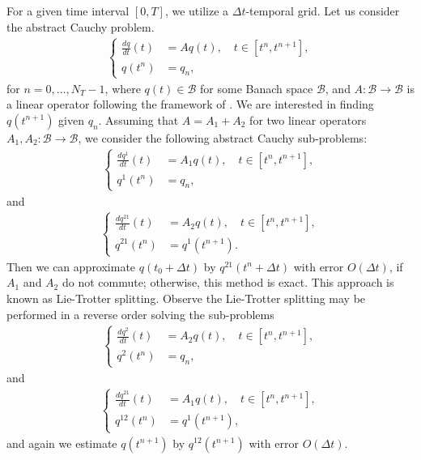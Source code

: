 For a given time interval $[0,T]$, we utilize a $\Delta t$-temporal grid. Let us consider the abstract Cauchy problem.
\begin{align*}
	\begin{cases}
		\frac{dq}{dt}(t) &= Aq(t), \quad t \in [t^n,t^{n+1}],\\
		q(t^n) &= q_n,
	\end{cases}
\end{align*}
for $n=0,\ldots, N_T-1$, where $q(t) \in \mathcal{B}$ for some Banach space $\mathcal{B}$, and $A:\mathcal{B} \to \mathcal{B}$ is a linear operator
following the framework of \citet[Chapter~3]{richtmyer:1968}.
We are interested in finding $q(t^{n+1})$ given $q_n$.
Assuming that $A = A_1 + A_2$ for two linear operators $A_1, A_2:\mathcal{B} \to \mathcal{B}$, we consider the following abstract Cauchy sub-problems:
\begin{align*}
	\begin{cases}
		\frac{dq^1}{dt}(t) &= A_1q(t), \quad t \in [t^{n},t^{n+1}],\\
		q^{1}(t^n) &= q_n,
	\end{cases}
\end{align*}
and
\begin{align*}
	\begin{cases}
		\frac{dq^{21}}{dt}(t) &= A_2q(t), \quad t \in [t^n,t^{n+1}],\\
		q^{21}(t^n) &= q^1(t^{n+1}).
	\end{cases}
\end{align*}
Then we can approximate $q(t_0 + \Delta t)$ by $q^{21}(t^n + \Delta t)$ with error $O(\Delta t)$, if $A_1$ and $A_2$
do not commute; otherwise, this method is exact.
This approach is known as Lie-Trotter splitting. Observe the  Lie-Trotter splitting may be performed
in a reverse order solving the sub-problems
\begin{align*}
	\begin{cases}
		\frac{dq^2}{dt}(t) &= A_2q(t), \quad t \in [t^n,t^{n+1}],\\
		q^{2}(t^n) &= q_n,
	\end{cases}
\end{align*}
and 
\begin{align*}
	\begin{cases}
		\frac{dq^{21}}{dt}(t) &= A_1q(t), \quad t \in [t^n,t^{n+1}],\\
		q^{12}(t^n) &= q^1(t^{n+1}),
	\end{cases}
\end{align*}
and again we estimate $q(t^{n+1})$ by $q^{12}(t^{n+1})$ with error $O(\Delta t)$.

